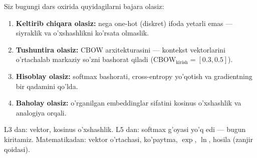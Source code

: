 \documentclass[aspectratio=169,11pt]{beamer}
\begin{document}
\begin{frame}{Siz bugungi dars oxirida quyidagilarni bajara olasiz:}
  \begin{enumerate}\setlength\itemsep{6pt}
    \item \textbf{Keltirib chiqara olasiz:} nega one-hot (diskret) ifoda
          yetarli emas --- siyraklik va o'xshashlikni ko'rsata olmaslik.
    \item \textbf{Tushuntira olasiz:} CBOW arxitekturasini --- kontekst
          vektorlarini o'rtachalab markaziy so'zni bashorat qiladi
          ($\text{CBOW}_{\text{kirish}}=[0.3,0.5]$).
    \item \textbf{Hisoblay olasiz:} softmax bashorati, cross-entropy yo'qotish
          va gradientning bir qadamini qo'lda.
    \item \textbf{Baholay olasiz:} o'rganilgan embeddinglar sifatini kosinus
          o'xshashlik va analogiya orqali.
  \end{enumerate}
  \vspace{4pt}
  \begin{tcolorbox}[defbox,title=Oldindan talab]
    \footnotesize
    L3 dan: vektor, kosinus o'xshashlik. L5 dan: softmax g'oyasi yo'q edi ---
    bugun kiritamiz. Matematikadan: vektor o'rtachasi, ko'paytma, $\exp$, $\ln$,
    hosila (zanjir qoidasi).
  \end{tcolorbox}
\end{frame}
\end{document}
